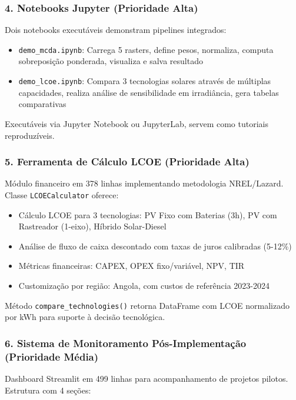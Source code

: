 \documentclass[12pt, a4paper]{article}
\begin{document}
{{{{{{{{{{{{\subsubsection{4. Notebooks Jupyter (Prioridade Alta)}

Dois notebooks executáveis demonstram pipelines integrados:

\begin{itemize}
    \item \texttt{demo\_mcda.ipynb}: Carrega 5 rasters, define pesos, normaliza, computa sobreposição ponderada, visualiza e salva resultado
    \item \texttt{demo\_lcoe.ipynb}: Compara 3 tecnologias solares através de múltiplas capacidades, realiza análise de sensibilidade em irradiância, gera tabelas comparativas
\end{itemize}

Executáveis via Jupyter Notebook ou JupyterLab, servem como tutoriais reproduzíveis.

\subsubsection{5. Ferramenta de Cálculo LCOE (Prioridade Alta)}

Módulo financeiro em 378 linhas implementando metodologia NREL/Lazard. Classe \texttt{LCOECalculator} oferece:

\begin{itemize}
    \item Cálculo LCOE para 3 tecnologias: PV Fixo com Baterias (3h), PV com Rastreador (1-eixo), Híbrido Solar-Diesel
    \item Análise de fluxo de caixa descontado com taxas de juros calibradas (5-12\%)
    \item Métricas financeiras: CAPEX, OPEX fixo/variável, NPV, TIR
    \item Customização por região: Angola, com custos de referência 2023-2024
\end{itemize}

Método \texttt{compare\_technologies()} retorna DataFrame com LCOE normalizado por kWh para suporte à decisão tecnológica.

\subsubsection{6. Sistema de Monitoramento Pós-Implementação (Prioridade Média)}

Dashboard Streamlit em 499 linhas para acompanhamento de projetos pilotos. Estrutura com 4 seções:

}}}}}}}}}}}}
\end{document}
